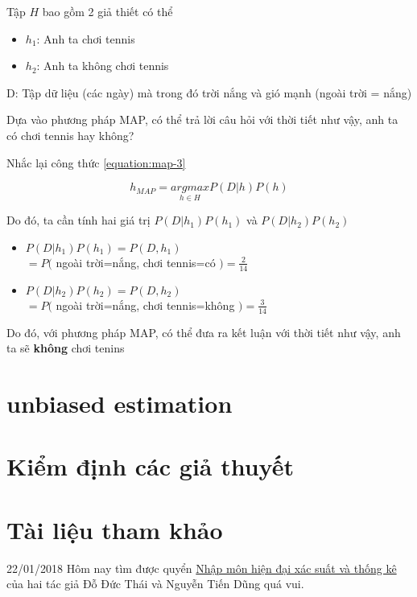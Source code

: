Tập $H$ bao gồm 2 giả thiết có thể

\begin{itemize}
  \item $h_1$: Anh ta chơi tennis
  \item $h_2$: Anh ta không chơi tennis
\end{itemize}

D: Tập dữ liệu (các ngày) mà trong đó trời nắng và gió mạnh (ngoài trời = nắng)

Dựa vào phương pháp MAP, có thể trả lời câu hỏi với thời tiết như vậy, anh ta có chơi tennis hay không?

Nhắc lại công thức \ref{equation:map-3}

\begin{equation}
h_{MAP} = \underset{h \in H}{argmax} P(D|h)P(h)
\end{equation}

Do đó, ta cần tính hai giá trị $P(D|h_1)P(h_1)$ và $P(D|h_2)P(h_2)$

\begin{itemize}
  \item $P(D|h_1)P(h_1) = P(D, h_1)$ \\ $ = P($ ngoài trời=nắng, chơi tennis=có $) = \frac{2}{14}$
  \item $P(D|h_2)P(h_2) = P(D, h_2)$ \\ $ = P($ ngoài trời=nắng, chơi tennis=không $) = \frac{3}{14}$
\end{itemize}

Do đó, với phương pháp MAP, có thể đưa ra kết luận với thời tiết như vậy, anh ta sẽ \textbf{không} chơi tenins

\section{unbiased estimation}

\section{Kiểm định các giả thuyết}

\section{Tài liệu tham khảo}

22/01/2018 Hôm nay tìm được quyển \href{http://www.vietmaths.net/2015/11/nhap-mon-hien-ai-xac-suat-va-thong-ke.html}{Nhập môn hiện đại xác suất và thống kê} của hai tác giả Đỗ Đức Thái và Nguyễn Tiến Dũng quá vui.